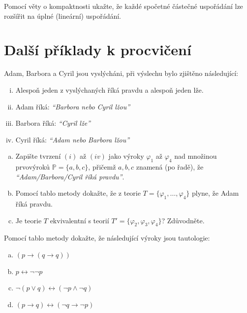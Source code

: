 \documentclass[a4paper,11pt]{amsart}
\begin{document}
\begin{problem}
    Pomocí věty o kompaktnosti ukažte, že každé spočetné částečné uspořádání lze rozšířit na úplné (lineární) uspořádání.
\end{problem}
        
        
\section*{Další příklady k procvičení}


\begin{problem}

    Adam, Barbora a Cyril jsou vyslýcháni, při výslechu bylo zjištěno následující:
    \begin{enumerate}[(i)]\it
        \item Alespoň jeden z vyslýchaných říká pravdu a alespoň jeden lže.
        \item Adam říká: \emph{``Barbora nebo Cyril lžou''}
        \item Barbora říká: \emph{``Cyril lže''}
        \item Cyril říká: \emph{``Adam nebo Barbora lžou''}
    \end{enumerate}
    \begin{enumerate}[(a)]
        \item Zapište tvrzení $(i)$ až $(iv)$ jako výroky $\varphi_1$ až $\varphi_4$ nad množinou prvovýroků $\mathbb{P}=\{a,b,c\}$, přičemž $a,b,c$ znamená (po řadě), že {\it ``Adam/Barbora/Cyril říká pravdu''}.
        \item Pomocí tablo metody dokažte, že z teorie $T = \{\varphi_1, \dots, \varphi_4\}$ plyne, že Adam říká pravdu.
        \item Je teorie $T$ ekvivalentní s teorií $T' = \{\varphi_2, \varphi_3, \varphi_4\}$? Zdůvodněte.    
    \end{enumerate}
    
\end{problem}
        

\begin{problem}

    Pomocí tablo metody dokažte, že následující výroky jsou tautologie:
    \begin{enumerate}[(a)]
        \item $(p\to (q \to q))$
        \item $p \leftrightarrow \neg \neg  p$
        \item $\neg (p \vee q) \leftrightarrow (\neg p \wedge \neg q)$
        \item $(p \to q) \leftrightarrow (\neg q \to \neg p)$    
    \end{enumerate}

\end{problem} 
   
\end{document}
